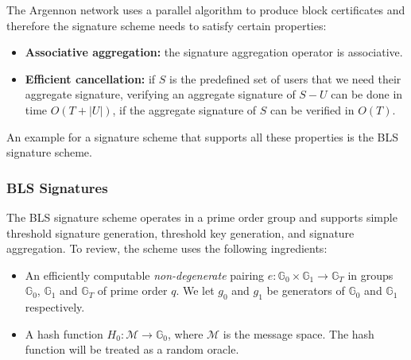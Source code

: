 The Argennon network uses a parallel algorithm to produce block certificates and therefore the signature scheme needs
to satisfy certain properties:
\begin{itemize}
    \item \textbf{Associative aggregation:} the signature aggregation operator is associative.
    \item \textbf{Efficient cancellation:} if $S$ is the predefined set of users that we need their aggregate
    signature, verifying an aggregate signature of $S-U$ can be done in time $O(T+|U|)$, if the aggregate
    signature of $S$ can be verified in $O(T)$.
\end{itemize}

An example for a signature scheme that supports all these properties is the BLS signature scheme.

\subsubsection{BLS Signatures}

The BLS signature scheme operates in a prime order group and supports simple threshold signature generation,
threshold key generation, and signature aggregation. To review, the scheme uses the following ingredients:

\newcommand{\G}{\mathbb{G}}
\newcommand{\Z}{\mathbb{Z}}
\newcommand{\adv}{{\cal A}}
\newcommand{\bdv}{{\cal B}}
\newcommand{\deq}{\mathrel{\mathop:}=}
\newcommand{\SK}{\mathit{sk}}
\newcommand{\PK}{\mathit{pk}}
\newcommand{\C}{\mathit{cert}}
\newcommand{\APK}{\mathit{apk}}
\newcommand{\DPK}{\mathit{\Delta pk}}
\newcommand{\MM}{\mathcal{M}}
\newcommand{\xwedge}{\, \operatorname{\text{$\wedge$}}\, }
\newcommand{\abs}[1]{\lvert #1 \rvert}
\newcommand{\Hm}{H_0}
\newcommand{\Hpk}{H_1}
\newcommand{\qHpk}{Q_{\Hpk}}
\newcommand{\qHm}{Q_{\Hm}}
\newcommand{\qsig}{Q_{\text{sig}}}

\begin{itemize}
    \item An efficiently computable \emph{non-degenerate} pairing $e:\G_0 \times \G_1 \to \G_T$
    in groups $\G_0$, $\G_1$ and $\G_T$ of prime order $q$. We let $g_0$ and $g_1$ be generators
    of $\G_0$ and $\G_1$ respectively.
    \item A hash function $H_0: \mathcal{M} \rightarrow \mathbb{G}_0$, where $\mathcal{M}$ is the message space.
    The hash function will be treated as a random oracle.
\end{itemize}

